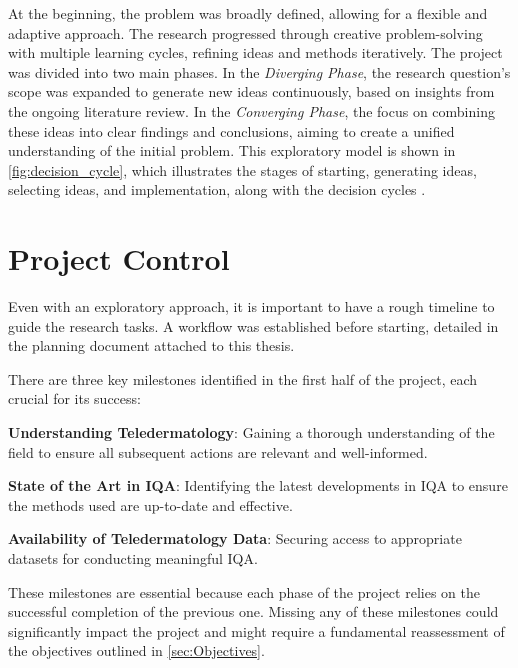 \vspace{\baselineskip}
\noindent
At the beginning, the problem was broadly defined, allowing for a flexible and adaptive approach. The research progressed through creative problem-solving with multiple learning cycles, refining ideas and methods iteratively. The project was divided into two main phases. In the \textit{Diverging Phase}, the research question’s scope was expanded to generate new ideas continuously, based on insights from the ongoing literature review. In the \textit{Converging Phase}, the focus on combining these ideas into clear findings and conclusions, aiming to create a unified understanding of the initial problem. This exploratory model is shown in \autoref{fig:decision_cycle}, which illustrates the stages of starting, generating ideas, selecting ideas, and implementation, along with the decision cycles \autocite{DesignThinking}.

\section{Project Control}
\label{sec:ProjectMonitoring}
Even with an exploratory approach, it is important to have a rough timeline to guide the research tasks. A workflow was established before starting, detailed in the planning document attached to this thesis. \par
\noindent
There are three key milestones identified in the first half of the project, each crucial for its success: \par
\vspace{\baselineskip}
\noindent
\textbf{Understanding Teledermatology}: Gaining a thorough understanding of the field to ensure all subsequent actions are relevant and well-informed. \par
\vspace{\baselineskip}
\noindent
\textbf{State of the Art in IQA}: Identifying the latest developments in IQA to ensure the methods used are up-to-date and effective. \par
\vspace{\baselineskip}
\noindent
\textbf{Availability of Teledermatology Data}:  Securing access to appropriate datasets for conducting meaningful IQA. \par
\vspace{\baselineskip}
\noindent
These milestones are essential because each phase of the project relies on the successful completion of the previous one. Missing any of these milestones could significantly impact the project and might require a fundamental reassessment of the objectives outlined in \autoref{sec:Objectives}. \par

